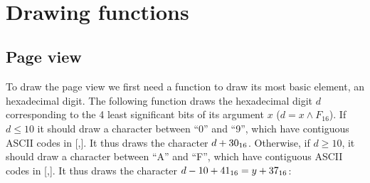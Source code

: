 \begin{TwoColumns}
\\
\\
\\
\\
\\
\\
\\
\\
\\
\\
\\
\\
~
\end{TwoColumns}

\section{Drawing functions}

\subsection{Page view}

To draw the page view we first need a function to draw its most basic element,
an hexadecimal digit. The following function draws the hexadecimal digit $d$
corresponding to the 4 least significant bits of its argument $x$ ($d=x \wedge
F_{16}$). If $d \le 10$ it should draw a character between ``0'' and ``9'',
which have contiguous ASCII codes in [,]. It thus draws the
character $d+30_{16}$. Otherwise, if $d \ge 10$, it should draw a character
between ``A'' and ``F'', which have contiguous ASCII codes in
[,]. It thus draws the character $d-10+41_{16}=y+37_{16}$:

